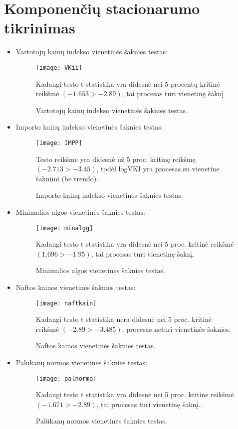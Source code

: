 \documentclass[a4paper]{article}
\begin{document}
\newpage
\section{Komponenčių stacionarumo tikrinimas}
\begin{itemize}
\item Vartotojų kainų indekso vienetinės šaknies testas:

\begin{figure}[H]
\centering 
\texttt{[image: VKii]}
\caption{Vartotojų kainų indekso vienetinės šaknies testas.}
\textnormal {Kadangi  testo t statistika yra didesnė nei 5 procentų kritinė reikšmė $(-1.653 > -2.89)$, tai  procesas turi vienetinę šaknį}
\end{figure}
 
\newpage
\item Importo kainų indekso vienetinės šaknies testas:
\begin{figure}[H]
\centering 
\texttt{[image: IMPP]}
\caption{Importo kainų indekso vienetinės šaknies testas.}
\textnormal{ Testo reikšme yra didesnė už 5 proc.  kritinę reikšmę $(-2.713>-3.45)$, todėl logVKI yra procesas su vienetine šaknimi (be trendo).}
\end{figure}

\newpage
\item Minimalios algos vienetinės šaknies testas:
\begin{figure}[H]
\centering 
\texttt{[image: minalgg]}
\caption{Minimalios algos vienetinės šaknies testas.}
\textnormal{Kadangi  testo t statistika yra didesnė nei 5 proc.  kritinė reikšmė $(1.696 > -1.95)$, tai  procesas turi vienetinę šaknį.}
\end{figure}

\newpage
\item Naftos kainos vienetinės šaknies testas:
\begin{figure}[H]
\centering 
\texttt{[image: naftkain]}
\caption{Naftos kainos vienetinės šaknies testas.}
\textnormal{Kadangi testo t statistika nėra didesnė nei 5 proc. kritinė reikšmė $(-2.89 > -3.485)$,  procesas neturi vienetinės  šaknies.}
\end{figure}

\newpage
\item Palūkanų normos vienetinės šaknies testas:
\begin{figure}[H]
\centering 
\texttt{[image: palnorma]}
\caption{Palūkanų normos vienetinės šaknies testas.}
\textnormal{Kadangi  testo t statistika yra didesnė nei 5 proc. kritinė reikšmė $(-1.671 > -2.89)$, tai  procesas turi vienetinę šaknį..}
\end{figure}


\end{itemize}
\end{document}

